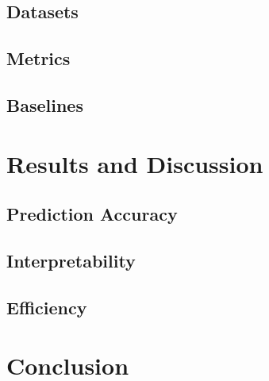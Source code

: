 \documentclass{article}
\begin{document}
\subsection{Datasets}

\subsection{Metrics}

\subsection{Baselines}

\section{Results and Discussion}\label{sec:results}
\subsection{Prediction Accuracy}

\subsection{Interpretability}

\subsection{Efficiency}

\section{Conclusion}\label{sec:conclusion}


\end{document}
